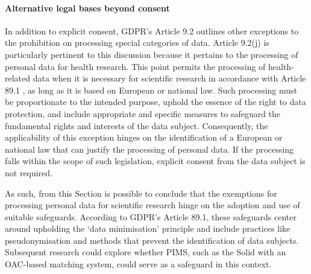 \paragraph{Alternative legal bases beyond consent}
In addition to explicit consent, GDPR's Article 9.2 \citeyearpar{noauthor_regulation_2016} outlines other exceptions to the prohibition on processing special categories of data.
Article 9.2(j) is particularly pertinent to this discussion because it pertains to the processing of personal data for health research.
This point permits the processing of health-related data when it is necessary for scientific research in accordance with Article 89.1 \citeyearpar{noauthor_regulation_2016}, as long as it is based on European or national law.
Such processing must be proportionate to the intended purpose, uphold the essence of the right to data protection, and include appropriate and specific measures to safeguard the fundamental rights and interests of the data subject.
Consequently, the applicability of this exception hinges on the identification of a European or national law that can justify the processing of personal data.
If the processing falls within the scope of such legislation, explicit consent from the data subject is not required.

As such, from this Section is possible to conclude that the exemptions for processing personal data for scientific research hinge on the adoption and use of suitable safeguards.
According to GDPR's Article 89.1, these safeguards center around upholding the `data minimisation' principle and include practices like pseudonymisation and methods that prevent the identification of data subjects.
Subsequent research could explore whether PIMS, such as the Solid with an OAC-based matching system, could serve as a safeguard in this context.

